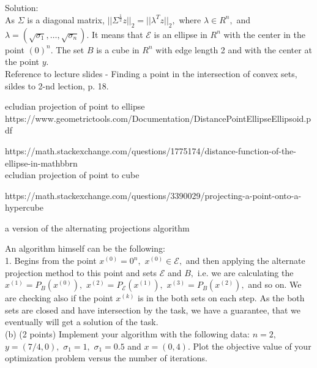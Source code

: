 \documentclass{article}
\begin{document}
Solution:\\
As $\Sigma$ is a diagonal matrix, 
$||\Sigma ^{\frac{1}{2} } z||_2 = 
||\lambda^T z||_2,$ where $\lambda \in R^n, $ and 
$\lambda = (\sqrt{\sigma_1}, \dots, \sqrt{\sigma_n}).$ It means that $\mathcal{E}$ is an ellipse in $R^n$ with the center in the point $(0)^n$. The set $B $ is a cube in $R^n$ with edge length 2 and with the center at the point $y.$ \\




Reference to lecture slides - Finding a point in the intersection of convex sets, sildes to 2-nd lection, p. 18.

ecludian projection of point to ellipse
https://www.geometrictools.com/Documentation/DistancePointEllipseEllipsoid.pdf

https://math.stackexchange.com/questions/1775174/distance-function-of-the-ellipse-in-mathbbrn
\\

ecludian projection of point to cube

https://math.stackexchange.com/questions/3390029/projecting-a-point-onto-a-hypercube

a version of the alternating projections algorithm

An algorithm himself can be the following: \\

1. Begins from the point $x^{(0)} = 0^n,$ $x^{(0)} \in \mathcal{E}, $ and then applying the alternate projection method to this point and sets $\mathcal{E}$ and $B,$ i.e.  we are calculating the $x^{(1)} = P_B(x^{(0)}),$ $x^{(2)} = P_{\mathcal{E}}(x^{(1)}),$ $x^{(3)} = P_B(x^{(2)}),$ and so on. We are checking also if the point $x^{(k)} $ is in the both sets on each step. As the both sets are closed and
have intersection by the task, we have a guarantee, that we eventually will get a solution of the task. \\ 

(b) (2 points) Implement your algorithm with the following data: $n = 2,$ $y = (7/4, 0),$
$\sigma_1 = 1,$ $\sigma_1 = 0.5$ and $x = (0, 4).$ Plot the objective value of your optimization problem versus the number of iterations.
\end{document}
